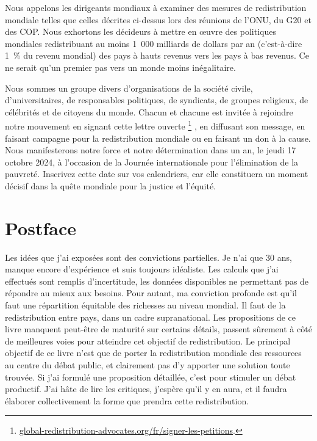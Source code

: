 \documentclass[a5paper,french]{memoir}
\begin{document}
Nous appelons les dirigeants mondiaux à examiner des mesures de redistribution mondiale telles que celles décrites ci-dessus lors des réunions de l'ONU, du G20 et des COP. Nous exhortons les décideurs à mettre en œuvre des politiques mondiales redistribuant au moins 1~000 milliards de dollars par an (c'est-à-dire 1~\% du revenu mondial) des pays à hauts revenus vers les pays à bas revenus. Ce ne serait qu'un premier pas vers un monde moins inégalitaire.

Nous sommes un groupe divers d'organisations de la société civile, d'universitaires, de responsables politiques, de syndicats, de groupes religieux, de célébrités et de citoyens du monde. Chacun et chacune est invitée à rejoindre notre mouvement en signant cette lettre ouverte
\footnote{\href{https://global-redistribution-advocates.org/fr/signer-les-petitions/?238=true}{global-redistribution-advocates.org/fr/signer-les-petitions}.}%
, en diffusant son message, en faisant campagne pour la redistribution mondiale ou en faisant un don à la cause. Nous manifesterons notre force et notre détermination dans un an, le jeudi 17 octobre 2024, à l'occasion de la Journée internationale pour l'élimination de la pauvreté. Inscrivez cette date sur vos calendriers, car elle constituera un moment décisif dans la quête mondiale pour la justice et l'équité.

\chapter{Postface}

Les idées que j'ai exposées sont des convictions partielles. Je n'ai que 30 ans, manque encore d'expérience et suis toujours idéaliste. Les calculs que j'ai effectués sont remplis d'incertitude, les données disponibles ne permettant pas de répondre au mieux aux besoins. Pour autant, ma conviction profonde est qu'il faut une répartition équitable des richesses au niveau mondial. Il faut de la redistribution entre pays, dans un cadre supranational. Les propositions de ce livre manquent peut-être de maturité %
sur certains détails, passent sûrement à côté de meilleures voies pour atteindre cet objectif de redistribution. Le principal objectif de ce livre n'est que de porter la redistribution mondiale des ressources au centre du débat public, et clairement pas d'y apporter une solution toute trouvée. Si j'ai formulé une proposition détaillée, c'est pour stimuler un débat productif. J'ai hâte de lire les critiques, j'espère qu'il y en aura, et il faudra élaborer collectivement la forme que prendra cette redistribution. 
\end{document}
